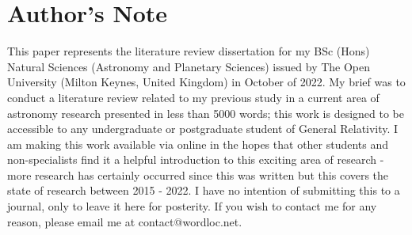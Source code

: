 \documentclass[12pt]{report}
\begin{document}
\section{Author's Note}

This paper represents the literature review dissertation for my BSc (Hons) Natural Sciences (Astronomy and Planetary Sciences) issued by The Open University (Milton Keynes, United Kingdom) in October of 2022. My brief was to conduct a literature review related to my previous study in a current area of astronomy research presented in less than 5000 words; this work is designed to be accessible to any undergraduate or postgraduate student of General Relativity. I am making this work available via online in the hopes that other students and non-specialists find it a helpful introduction to this exciting area of research - more research has certainly occurred since this was written but this covers the state of research between 2015 - 2022. I have no intention of submitting this to a journal, only to leave it here for posterity. If you wish to contact me for any reason, please email me at contact@wordloc.net.



\printbibliography
\end{document}
